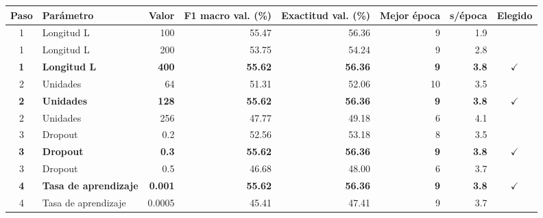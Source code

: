 \begin{tabular}{clrrrrrc}
\toprule
Paso & Parámetro & Valor & F1 macro val. (\%) & Exactitud val. (\%) & Mejor época & s/época & Elegido \\
\midrule
1 & Longitud L & 100 & 55.47 & 56.36 & 9 & 1.9 &  \\
1 & Longitud L & 200 & 53.75 & 54.24 & 9 & 2.8 &  \\
\textbf{1} & \textbf{Longitud L} & \textbf{400} & \textbf{55.62} & \textbf{56.36} & \textbf{9} & \textbf{3.8} & \textbf{$\checkmark$} \\
2 & Unidades & 64 & 51.31 & 52.06 & 10 & 3.5 &  \\
\textbf{2} & \textbf{Unidades} & \textbf{128} & \textbf{55.62} & \textbf{56.36} & \textbf{9} & \textbf{3.8} & \textbf{$\checkmark$} \\
2 & Unidades & 256 & 47.77 & 49.18 & 6 & 4.1 &  \\
3 & Dropout & 0.2 & 52.56 & 53.18 & 8 & 3.5 &  \\
\textbf{3} & \textbf{Dropout} & \textbf{0.3} & \textbf{55.62} & \textbf{56.36} & \textbf{9} & \textbf{3.8} & \textbf{$\checkmark$} \\
3 & Dropout & 0.5 & 46.68 & 48.00 & 6 & 3.7 &  \\
\textbf{4} & \textbf{Tasa de aprendizaje} & \textbf{0.001} & \textbf{55.62} & \textbf{56.36} & \textbf{9} & \textbf{3.8} & \textbf{$\checkmark$} \\
4 & Tasa de aprendizaje & 0.0005 & 45.41 & 47.41 & 9 & 3.7 &  \\
\bottomrule
\end{tabular}
